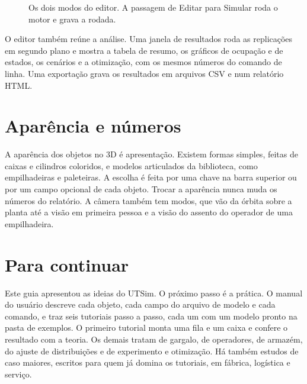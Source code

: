 \begin{figure}[ht]
\centering
{}
\caption{Os dois modos do editor. A passagem de Editar para Simular roda o motor e grava a rodada.}
\label{fig-modos}
\end{figure}

O editor também reúne a análise. Uma janela de resultados roda as replicações em segundo plano e mostra a tabela de resumo, os gráficos de ocupação e de estados, os cenários e a otimização, com os mesmos números do comando de linha. Uma exportação grava os resultados em arquivos CSV e num relatório HTML.

\section{Aparência e números}

A aparência dos objetos no 3D é apresentação. Existem formas simples, feitas de caixas e cilindros coloridos, e modelos articulados da biblioteca, como empilhadeiras e paleteiras. A escolha é feita por uma chave na barra superior ou por um campo opcional de cada objeto. Trocar a aparência nunca muda os números do relatório. A câmera também tem modos, que vão da órbita sobre a planta até a visão em primeira pessoa e a visão do assento do operador de uma empilhadeira.

\section{Para continuar}

Este guia apresentou as ideias do UTSim. O próximo passo é a prática. O manual do usuário descreve cada objeto, cada campo do arquivo de modelo e cada comando, e traz seis tutoriais passo a passo, cada um com um modelo pronto na pasta de exemplos. O primeiro tutorial monta uma fila e um caixa e confere o resultado com a teoria. Os demais tratam de gargalo, de operadores, de armazém, do ajuste de distribuições e de experimento e otimização. Há também estudos de caso maiores, escritos para quem já domina os tutoriais, em fábrica, logística e serviço.


